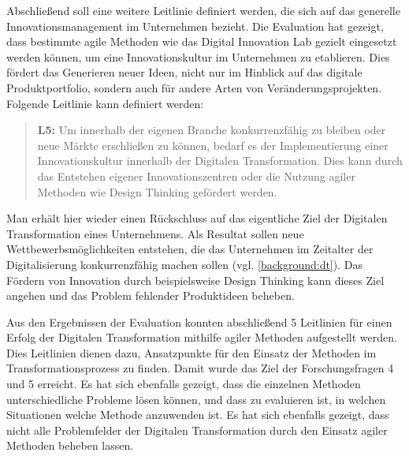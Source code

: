 Abschließend soll eine weitere Leitlinie definiert werden, die sich auf  das generelle Innovationsmanagement im Unternehmen bezieht. Die Evaluation hat gezeigt, dass bestimmte agile Methoden wie das Digital Innovation Lab gezielt eingesetzt werden können, um eine Innovationskultur im Unternehmen zu etablieren. Dies fördert das Generieren neuer Ideen, nicht nur im Hinblick auf das digitale Produktportfolio,  sondern auch für andere Arten von Veränderungsprojekten. Folgende Leitlinie kann definiert werden:

\begin{quote}
	\textbf{L5:} Um innerhalb der eigenen Branche konkurrenzfähig zu bleiben oder neue Märkte erschließen zu können, bedarf es der Implementierung einer Innovationskultur innerhalb der Digitalen Transformation. Dies kann durch das Entstehen eigener Innovationszentren oder die Nutzung agiler Methoden wie Design Thinking gefördert werden.
\end{quote}

Man erhält hier wieder einen Rückschluss auf das eigentliche Ziel der Digitalen Transformation eines Unternehmens. Als Resultat sollen neue Wettbewerbsmöglichkeiten entstehen, die das Unternehmen im Zeitalter der Digitalisierung konkurrenzfähig machen sollen (vgl. \ref{background:dt}). Das Fördern von Innovation durch beispielsweise Design Thinking kann dieses Ziel angehen und das Problem fehlender Produktideen beheben.

Aus den Ergebnissen der Evaluation konnten abschließend 5 Leitlinien für einen Erfolg der Digitalen Transformation mithilfe agiler Methoden aufgestellt werden. Dies Leitlinien dienen dazu, Ansatzpunkte für den Einsatz der Methoden im Transformationsprozess zu finden. Damit wurde das Ziel der Forschungsfragen 4 und 5 erreicht. Es hat sich ebenfalls gezeigt, dass die einzelnen Methoden unterschiedliche Probleme lösen können, und dass zu evaluieren ist, in welchen Situationen welche Methode anzuwenden ist. Es hat sich ebenfalls gezeigt, dass nicht alle Problemfelder der Digitalen Transformation durch den Einsatz agiler Methoden beheben lassen.



